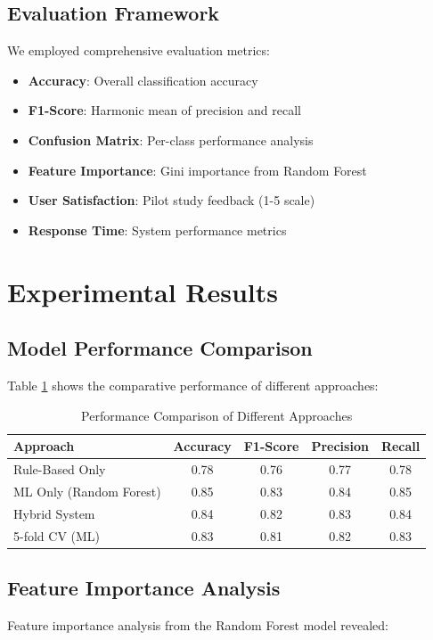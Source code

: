 \documentclass[conference]{IEEEtran}
\begin{document}
\subsection{Evaluation Framework}
We employed comprehensive evaluation metrics:

\begin{itemize}
\item \textbf{Accuracy}: Overall classification accuracy
\item \textbf{F1-Score}: Harmonic mean of precision and recall
\item \textbf{Confusion Matrix}: Per-class performance analysis
\item \textbf{Feature Importance}: Gini importance from Random Forest
\item \textbf{User Satisfaction}: Pilot study feedback (1-5 scale)
\item \textbf{Response Time}: System performance metrics
\end{itemize}

\section{Experimental Results}

\subsection{Model Performance Comparison}

Table \ref{tab:performance} shows the comparative performance of different approaches:

\begin{table}[h]
\centering
\caption{Performance Comparison of Different Approaches}
\label{tab:performance}
\begin{tabular}{@{}lcccc@{}}
\toprule
\textbf{Approach} & \textbf{Accuracy} & \textbf{F1-Score} & \textbf{Precision} & \textbf{Recall} \\
\midrule
Rule-Based Only & 0.78 & 0.76 & 0.77 & 0.78 \\
ML Only (Random Forest) & 0.85 & 0.83 & 0.84 & 0.85 \\
Hybrid System & 0.84 & 0.82 & 0.83 & 0.84 \\
5-fold CV (ML) & 0.83 & 0.81 & 0.82 & 0.83 \\
\bottomrule
\end{tabular}
\end{table}

\subsection{Feature Importance Analysis}
Feature importance analysis from the Random Forest model revealed:
\end{document}
